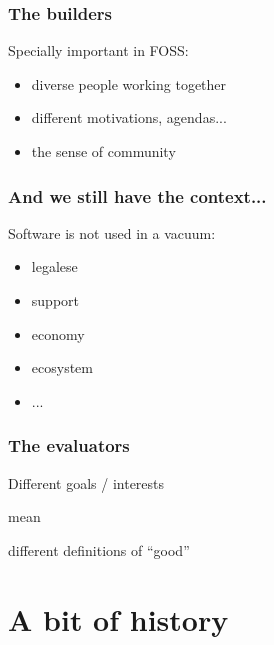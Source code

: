 \documentclass[17pt,aspectratio=169,hyperref=pdfusetitle]{beamer}
\begin{document}
\begin{frame}[fragile]
  \frametitle{The builders}

  Specially important in FOSS:

  \begin{itemize}
  \item diverse people working together
  \item different motivations, agendas...
  \item the sense of community
  \end{itemize}
    
\end{frame}

\begin{frame}[fragile]
  \frametitle{And we still have the context...}

  Software is not used in a vacuum:

  \begin{itemize}
  \item legalese
  \item support
  \item economy
  \item ecosystem
  \item ...
  \end{itemize}
\end{frame}


\begin{frame}[fragile]
  \frametitle{The evaluators}

  \begin{center}
  Different goals / interests

  mean

  different definitions of ``good''
  \end{center}
    
\end{frame}

\section{A bit of history}
\end{document}
